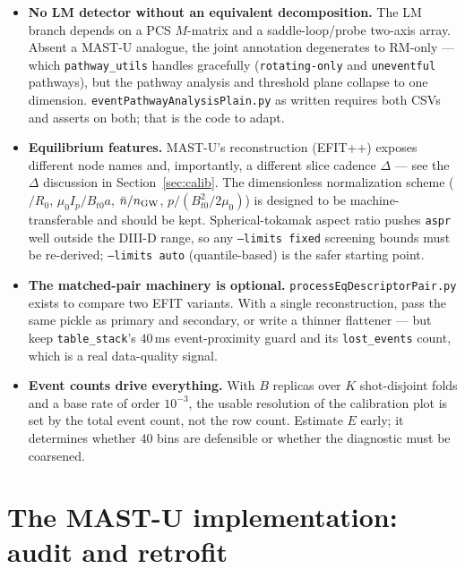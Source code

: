 \documentclass[11pt,a4paper]{article}
\newcommand{\code}[1]{\texttt{\small #1}}
\newcommand{\bk}{\discretionary{}{}{}}   %
\begin{document}
\begin{itemize}[leftmargin=2em]
\item \textbf{No LM detector without an equivalent decomposition.} The LM branch depends on a PCS
$M$-matrix and a saddle-loop/probe two-axis array. Absent a MAST-U analogue, the joint annotation
degenerates to RM-only --- which \code{pathway\_utils} handles gracefully (\code{rotating-only} and
\code{uneventful} pathways), but the pathway analysis and threshold plane collapse to one
dimension. \code{eventPathway\bk Analysis\bk Plain.py} as written requires both CSVs and asserts on both;
that is the code to adapt.
\item \textbf{Equilibrium features.} MAST-U's reconstruction (EFIT++) exposes different node names
and, importantly, a different slice cadence $\Delta$ --- see the $\Delta$ discussion in
Section~\ref{sec:calib}. The dimensionless normalization scheme ($/R_0$, $\mu_0 I_p/B_{t0}a$,
$\bar n/n_{\rm GW}$, $p/(B_{t0}^2/2\mu_0)$) is designed to be machine-transferable and should be
kept. Spherical-tokamak aspect ratio pushes \code{aspr} well outside the DIII-D range, so any
\code{--limits fixed} screening bounds must be re-derived; \code{--limits auto} (quantile-based) is
the safer starting point.
\item \textbf{The matched-pair machinery is optional.} \code{processEq\bk Descriptor\bk Pair.py} exists to
compare two EFIT variants. With a single reconstruction, pass the same pickle as primary and
secondary, or write a thinner flattener --- but keep \code{table\_stack}'s $40$\,ms event-proximity
guard and its \code{lost\_events} count, which is a real data-quality signal.
\item \textbf{Event counts drive everything.} With $B$ replicas over $K$ shot-disjoint folds and a
base rate of order $10^{-3}$, the usable resolution of the calibration plot is set by the total
event count, not the row count. Estimate $E$ early; it determines whether $40$ bins are defensible
or whether the diagnostic must be coarsened.
\end{itemize}

\section{The MAST-U implementation: audit and retrofit}
\label{sec:mastuimpl}
\end{document}
